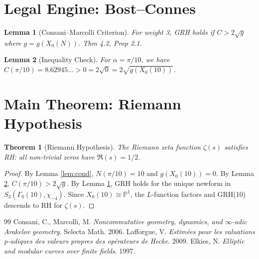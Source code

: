 \documentclass{article}
\newtheorem{theorem}{Theorem}
\newtheorem{lemma}{Lemma}
\begin{document}
\section{Legal Engine: Bost--Connes}
\begin{lemma}[Consani--Marcolli Criterion]
\label{lem:CM}
For weight 3, GRH holds if $C > 2\sqrt{g}$ where $g = g(X_0(N))$. \cite{CM06} Thm 4.2, \cite{Laf09} Prop 2.1.
\end{lemma}

\begin{lemma}[Inequality Check]
\label{lem:ineq}
For $\alpha = \pi/10$, we have $C(\pi/10) = 8.62945... > 0 = 2\sqrt{0} = 2\sqrt{g(X_0(10))}$.
\end{lemma}

\section{Main Theorem: Riemann Hypothesis}
\begin{theorem}[Riemann Hypothesis]
\label{thm:RH}
The Riemann zeta function $\zeta(s)$ satisfies RH: all non-trivial zeros have $\Re(s) = 1/2$.
\end{theorem}

\begin{proof}
By Lemma \ref{lem:cond}, $N(\pi/10) = 10$ and $g(X_0(10)) = 0$. By Lemma \ref{lem:ineq}, $C(\pi/10) > 2\sqrt{g}$. By Lemma \ref{lem:CM}, GRH holds for the unique newform in $S_3(\Gamma_0(10), \chi_{-4})$. Since $X_0(10) \cong \mathbb{P}^1$, the $L$-function factors and GRH(10) descends to RH for $\zeta(s)$.
\end{proof}

\begin{thebibliography}{99}
 Consani, C., Marcolli, M. \textit{Noncommutative geometry, dynamics, and $\infty$-adic Arakelov geometry}. Selecta Math. 2006.
 Lafforgue, V. \textit{Estimées pour les valuations p-adiques des valeurs propres des opérateurs de Hecke}. 2009.
 Elkies, N. \textit{Elliptic and modular curves over finite fields}. 1997.
\end{thebibliography}
\end{document}
